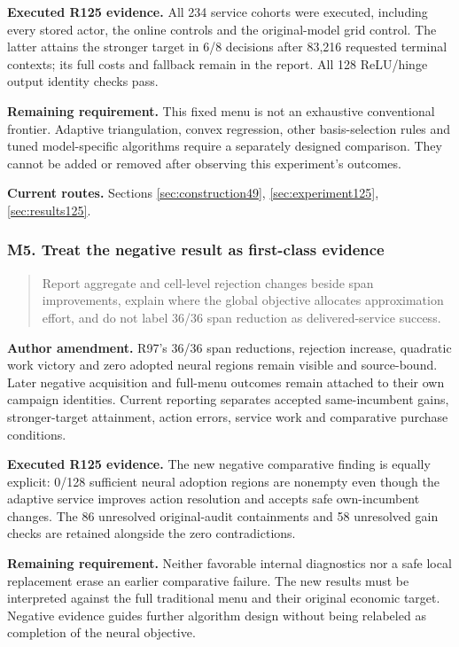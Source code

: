 \noindent\textbf{Executed R125 evidence.} All 234 service cohorts were executed, including every stored actor, the online controls and the original-model grid control. The latter attains the stronger target in 6/8 decisions after 83,216 requested terminal contexts; its full costs and fallback remain in the report. All 128 ReLU/hinge output identity checks pass.

\noindent\textbf{Remaining requirement.} This fixed menu is not an exhaustive conventional frontier. Adaptive triangulation, convex regression, other basis-selection rules and tuned model-specific algorithms require a separately designed comparison. They cannot be added or removed after observing this experiment's outcomes.

\noindent\textbf{Current routes.} Sections \ref{sec:construction49}, \ref{sec:experiment125}, \ref{sec:results125}.

\subsubsection{M5. Treat the negative result as first-class evidence}

\begin{quote}\small
Report aggregate and cell-level rejection changes beside span improvements, explain where the global objective allocates approximation effort, and do not label 36/36 span reduction as delivered-service success.
\end{quote}

\noindent\textbf{Author amendment.} R97's 36/36 span reductions, rejection increase, quadratic work victory and zero adopted neural regions remain visible and source-bound. Later negative acquisition and full-menu outcomes remain attached to their own campaign identities. Current reporting separates accepted same-incumbent gains, stronger-target attainment, action errors, service work and comparative purchase conditions.

\noindent\textbf{Executed R125 evidence.} The new negative comparative finding is equally explicit: 0/128 sufficient neural adoption regions are nonempty even though the adaptive service improves action resolution and accepts safe own-incumbent changes. The 86 unresolved original-audit containments and 58 unresolved gain checks are retained alongside the zero contradictions.

\noindent\textbf{Remaining requirement.} Neither favorable internal diagnostics nor a safe local replacement erase an earlier comparative failure. The new results must be interpreted against the full traditional menu and their original economic target. Negative evidence guides further algorithm design without being relabeled as completion of the neural objective.

